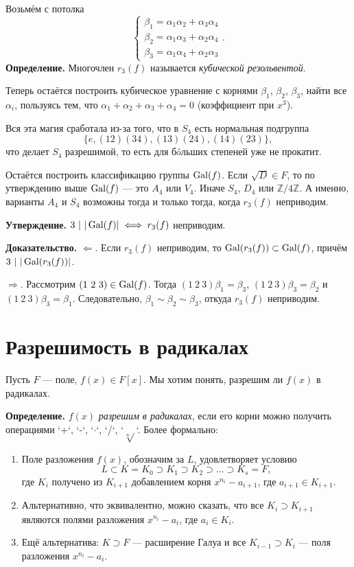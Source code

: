 Возьмём с потолка 
\[
    \begin{cases}
        \beta_1 = \alpha_1 \alpha_2 + \alpha_3 \alpha_4 \\
        \beta_2 = \alpha_1 \alpha_3 + \alpha_2 \alpha_4 \\
        \beta_3 = \alpha_1 \alpha_4 + \alpha_2 \alpha_3
    \end{cases}
    .
\]
\textbf{Определение.} Многочлен $r_3(f)$ называется \textit{кубической резольвентой}.

Теперь остаётся построить кубическое уравнение с корнями $\beta_1$, $\beta_2$, $\beta_3$, найти все $\alpha_i$, пользуясь тем, что $\alpha_1 + \alpha_2 + \alpha_3 + \alpha_4 = 0$ (коэффициент при $x^3$).

Вся эта магия сработала из-за того, что в $S_4$ есть нормальная подгруппа
\[
    \{e, (12)(34), (13)(24), (14)(23)\},
\]
что делает $S_4$ разрешимой, то есть для бóльших степеней уже не прокатит.

Остаётся построить классификацию группы $\operatorname{Gal}(f)$.
Если $\sqrt D \in F$, то по утверждению выше $\operatorname{Gal}(f)$ --- это $A_4$ или $V_4$.
Иначе $S_4$, $D_4$ или $\mathbb Z / 4 \mathbb Z$.
А именно, варианты $A_4$ и $S_4$ возможны тогда и только тогда, когда $r_3(f)$ неприводим.

\textbf{Утверждение.} $3~|~|\operatorname{Gal}(f)| \iff r_3(f)$ неприводим.

\textbf{Доказательство.} $\Leftarrow$. Если $r_3(f)$ неприводим, то $\operatorname{Gal}(r_3(f)) \subset \operatorname{Gal}(f)$, причём $3~|~|\operatorname{Gal}(r_3(f))|$.

$\Rightarrow$. Рассмотрим $(1~2~3) \in \operatorname{Gal}(f)$.
Тогда $(1~2~3) \beta_1 = \beta_3$, $(1~2~3) \beta_3 = \beta_2$ и $(1~2~3) \beta_3 = \beta_1$.
Следовательно, $\beta_1 \sim \beta_2 \sim \beta_3$, откуда $r_3(f)$ неприводим.

\QED

\section{Разрешимость в радикалах}
Пусть $F$ --- поле, $f(x) \in F[x]$.
Мы хотим понять, разрешим ли $f(x)$ в радикалах.

\textbf{Определение.} $f(x)$ \textit{разрешим в радикалах}, если его корни можно получить операциями `+`, `-`, `$\cdot$`, `/`, `$\sqrt[n]{}$`.
Более формально:
\begin{enumerate}
    \item Поле разложения $f(x)$, обозначим за $L$, удовлетворяет условию
        \[
            L \subset K = K_0 \supset K_1 \supset K_2 \supset \dots \supset K_s = F,
        \]
        где $K_i$ получено из $K_{i+1}$ добавлением корня $x^{n_i} - a_{i + 1}$, где $a_{i+1} \in K_{i+1}$.

    \item Альтернативно, что эквивалентно, можно сказать, что все $K_i \supset K_{i+1}$ являются полями разложения $x^{n_i} - a_i$, где $a_i \in K_i$.
        
    \item Ещё альтернатива: $K \supset F$ --- расширение Галуа и все $K_{i-1} \supset K_i$ --- поля разложения $x^{n_i} - a_i$.
\end{enumerate}

